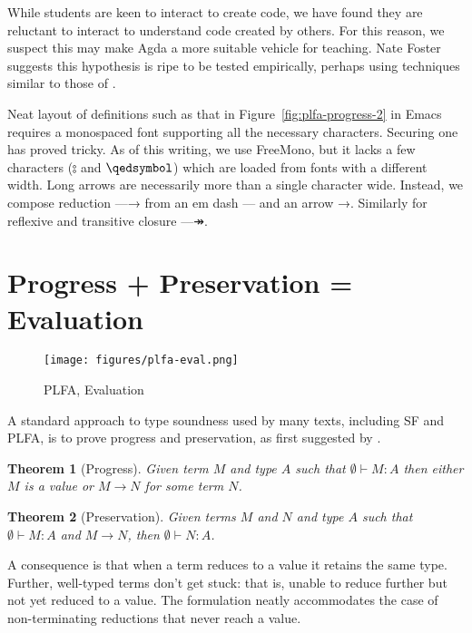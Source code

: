 \documentclass[preprint,authoryear]{elsarticle}
\newtheorem{theorem}{Theorem}
\begin{document}
While students are keen to interact to create code, we have found they
are reluctant to interact to understand code created by others. For
this reason, we suspect this may make Agda a more suitable vehicle for
teaching.  Nate Foster suggests this hypothesis is ripe to be tested
empirically, perhaps using techniques similar to those of
\citet{Danas-et-al-2017}.

Neat layout of definitions such as that in
Figure~\ref{fig:plfa-progress-2} in Emacs requires a monospaced font
supporting all the necessary characters.  Securing one has proved
tricky. As of this writing, we use FreeMono, but it lacks a few
characters ($\typecolon$ and $\qedsymbol$) which are loaded from fonts with a different
width.  Long arrows are necessarily more than a single character wide.
Instead, we compose reduction —→ from an em dash — and an arrow →.
Similarly for reflexive and transitive closure —↠.

\section{Progress + Preservation = Evaluation}

\begin{figure}
  \texttt{[image: figures/plfa-eval.png]}
  \caption{PLFA, Evaluation}
  \label{fig:plfa-eval}
\end{figure}

A standard approach to type soundness used by many texts,
including SF and PLFA, is to prove progress and preservation,
as first suggested by \citet{Wright-and-Felleisen-1994}.

\begin{theorem}[Progress] Given term $M$ and type $A$ such that
$\emptyset \vdash M : A$ then either $M$ is a value or
$M \longrightarrow N$ for some term $N$.
\end{theorem}

\begin{theorem}[Preservation] Given terms $M$ and $N$ and type $A$
such that $\emptyset \vdash M : A$ and $M \longrightarrow N$, then
$\emptyset \vdash N : A$.  \end{theorem}

A consequence is that when a term reduces to a value it retains
the same type.  Further, well-typed terms don't get stuck:
that is, unable to reduce further but not yet reduced to a value.
The formulation neatly accommodates the case of non-terminating
reductions that never reach a value.
\end{document}
